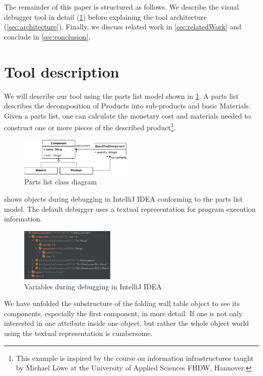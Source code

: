 \documentclass[conference]{IEEEtran}
\newcommand{\intellij}{IntelliJ IDEA}
\begin{document}
The remainder of this paper is structured as follows.
We describe the visual debugger tool in detail (\cref{sec:toolDescription}) before explaining the tool architecture (\cref{sec:architecture}).
Finally, we discuss related work in \cref{sec:relatedWork} and conclude in \cref{sec:conclusion}.

\section{Tool description} \label{sec:toolDescription}
We will describe our tool using the parts list model shown in \cref{fig:partsListModel}.
A parts list describes the decomposition of \textsf{Products} into sub-products and basic \textsf{Materials}.
Given a parts list, one can calculate the monetary cost and materials needed to construct one or more pieces of the described product\footnote{This example is inspired by the course on information infrastructures taught by Michael Löwe at the University of Applied Sciences FHDW, Hannover.}.

\begin{figure}[h]
    \centering
    \includegraphics[width=0.48\textwidth]{images/VD-partsList-classes.pdf}
    \caption{Parts list class diagram}
    \label{fig:partsListModel}
\end{figure}

 shows objects during debugging in \intellij{} conforming to the parts list model. 
The default debugger uses a textual representation for program execution information.

\begin{figure}[h]
    \centering
    \includegraphics[width=0.4\textwidth]{images/variables.png}
    \caption{Variables during debugging in \intellij}
    \label{fig:variablesIntellij}
\end{figure}

We have unfolded the substructure of the \textsf{folding wall table} object to see its components, especially the first component, in more detail.
If one is not only interested in one attribute inside one object, but rather the whole object world using the textual representation is cumbersome.
\end{document}
